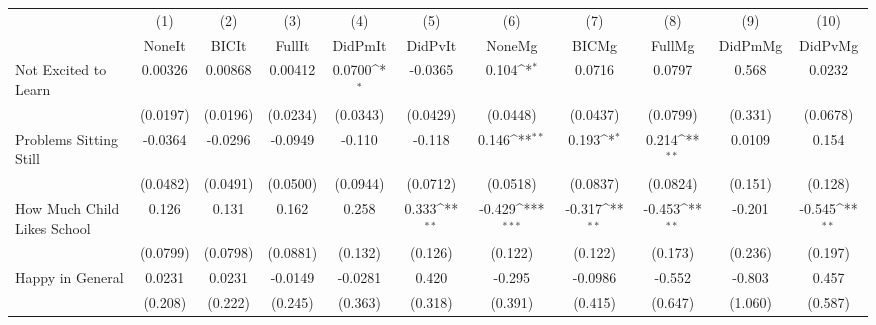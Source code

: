 {
\def\sym#1{\ifmmode^{#1}\else\(^{#1}\)\fi}
\begin{tabular}{l*{10}{c}}
\toprule
            &\multicolumn{1}{c}{(1)}&\multicolumn{1}{c}{(2)}&\multicolumn{1}{c}{(3)}&\multicolumn{1}{c}{(4)}&\multicolumn{1}{c}{(5)}&\multicolumn{1}{c}{(6)}&\multicolumn{1}{c}{(7)}&\multicolumn{1}{c}{(8)}&\multicolumn{1}{c}{(9)}&\multicolumn{1}{c}{(10)}\\
            &\multicolumn{1}{c}{NoneIt}&\multicolumn{1}{c}{BICIt}&\multicolumn{1}{c}{FullIt}&\multicolumn{1}{c}{DidPmIt}&\multicolumn{1}{c}{DidPvIt}&\multicolumn{1}{c}{NoneMg}&\multicolumn{1}{c}{BICMg}&\multicolumn{1}{c}{FullMg}&\multicolumn{1}{c}{DidPmMg}&\multicolumn{1}{c}{DidPvMg}\\
\midrule
Not Excited to Learn&     0.00326         &     0.00868         &     0.00412         &      0.0700\sym{*}  &     -0.0365         &       0.104\sym{*}  &      0.0716         &      0.0797         &       0.568         &      0.0232         \\
            &    (0.0197)         &    (0.0196)         &    (0.0234)         &    (0.0343)         &    (0.0429)         &    (0.0448)         &    (0.0437)         &    (0.0799)         &     (0.331)         &    (0.0678)         \\
\addlinespace
Problems Sitting Still&     -0.0364         &     -0.0296         &     -0.0949         &      -0.110         &      -0.118         &       0.146\sym{**} &       0.193\sym{*}  &       0.214\sym{**} &      0.0109         &       0.154         \\
            &    (0.0482)         &    (0.0491)         &    (0.0500)         &    (0.0944)         &    (0.0712)         &    (0.0518)         &    (0.0837)         &    (0.0824)         &     (0.151)         &     (0.128)         \\
\addlinespace
How Much Child Likes School&       0.126         &       0.131         &       0.162         &       0.258         &       0.333\sym{**} &      -0.429\sym{***}&      -0.317\sym{**} &      -0.453\sym{**} &      -0.201         &      -0.545\sym{**} \\
            &    (0.0799)         &    (0.0798)         &    (0.0881)         &     (0.132)         &     (0.126)         &     (0.122)         &     (0.122)         &     (0.173)         &     (0.236)         &     (0.197)         \\
\addlinespace
Happy in General&      0.0231         &      0.0231         &     -0.0149         &     -0.0281         &       0.420         &      -0.295         &     -0.0986         &      -0.552         &      -0.803         &       0.457         \\
            &     (0.208)         &     (0.222)         &     (0.245)         &     (0.363)         &     (0.318)         &     (0.391)         &     (0.415)         &     (0.647)         &     (1.060)         &     (0.587)         \\
\bottomrule
\end{tabular}
}
